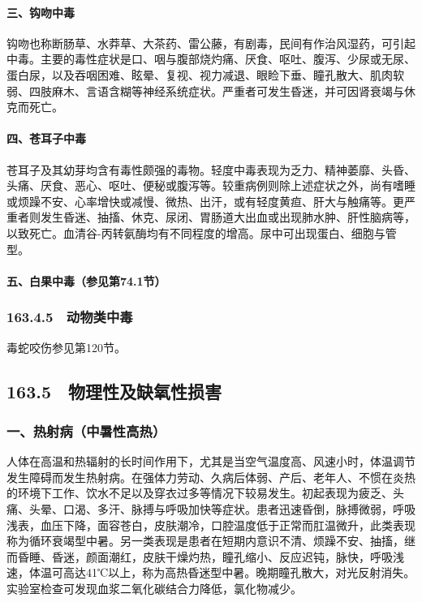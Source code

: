 \paragraph{三、钩吻中毒}

钩吻也称断肠草、水莽草、大茶药、雷公藤，有剧毒，民间有作治风湿药，可引起中毒。主要的毒性症状是口、咽与腹部烧灼痛、厌食、呕吐、腹泻、少尿或无尿、蛋白尿，以及吞咽困难、眩晕、复视、视力减退、眼睑下垂、瞳孔散大、肌肉软弱、四肢麻木、言语含糊等神经系统症状。严重者可发生昏迷，并可因肾衰竭与休克而死亡。

\paragraph{四、苍耳子中毒}

苍耳子及其幼芽均含有毒性颇强的毒物。轻度中毒表现为乏力、精神萎靡、头昏、头痛、厌食、恶心、呕吐、便秘或腹泻等。较重病例则除上述症状之外，尚有嗜睡或烦躁不安、心率增快或减慢、微热、出汗，或有轻度黄疸、肝大与触痛等。更严重者则发生昏迷、抽搐、休克、尿闭、胃肠道大出血或出现肺水肿、肝性脑病等，以致死亡。血清谷-丙转氨酶均有不同程度的增高。尿中可出现蛋白、细胞与管型。

\paragraph{五、白果中毒（参见第74.1节）}

\subsubsection{163.4.5　动物类中毒}

毒蛇咬伤参见第120节。

\protect\hypertarget{text00374.html}{}{}

\subsection{163.5　物理性及缺氧性损害}

\subsubsection{一、热射病（中暑性高热）}

人体在高温和热辐射的长时间作用下，尤其是当空气温度高、风速小时，体温调节发生障碍而发生热射病。在强体力劳动、久病后体弱、产后、老年人、不惯在炎热的环境下工作、饮水不足以及穿衣过多等情况下较易发生。初起表现为疲乏、头痛、头晕、口渴、多汗、脉搏与呼吸加快等症状。患者迅速昏倒，脉搏微弱，呼吸浅表，血压下降，面容苍白，皮肤潮冷，口腔温度低于正常而肛温微升，此类表现称为循环衰竭型中暑。另一类表现是患者在短期内意识不清、烦躁不安、抽搐，继而昏睡、昏迷，颜面潮红，皮肤干燥灼热，瞳孔缩小、反应迟钝，脉快，呼吸浅速，体温可高达41℃以上，称为高热昏迷型中暑。晚期瞳孔散大，对光反射消失。实验室检查可发现血浆二氧化碳结合力降低，氯化物减少。

